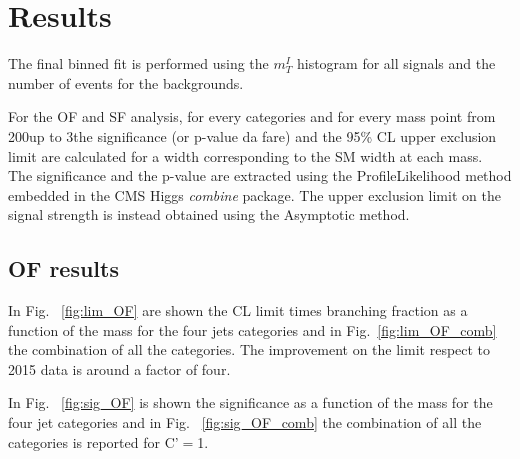 \section{Results}\label{sec:results}
The final binned fit is performed using the $m_T^I$ histogram for all signals and the number of events for the backgrounds.
 
For the OF and SF analysis, for every categories and for every mass point from
200\GeV up to 3\TeV the significance (or p-value da fare) and the 95\% CL
upper exclusion limit are calculated for a width corresponding to the SM width
at each mass.\\

The significance and the p-value are extracted using the ProfileLikelihood method embedded in the CMS Higgs \textit{combine} package. The upper exclusion limit on the signal strength is instead obtained using the Asymptotic method.

\subsection{OF results}\label{sec:results}

In Fig. ~\ref{fig:lim_OF} are shown the CL limit times branching fraction  as a function of the mass for the four jets categories and in Fig.~\ref{fig:lim_OF_comb} the combination of all the categories. The  improvement on the limit respect to 2015 data is around a factor of four.

In Fig.  ~\ref{fig:sig_OF} is shown the significance as a function of the mass for the four jet categories and in Fig. ~\ref{fig:sig_OF_comb} the
combination of all the categories is reported for C'$=$1.


